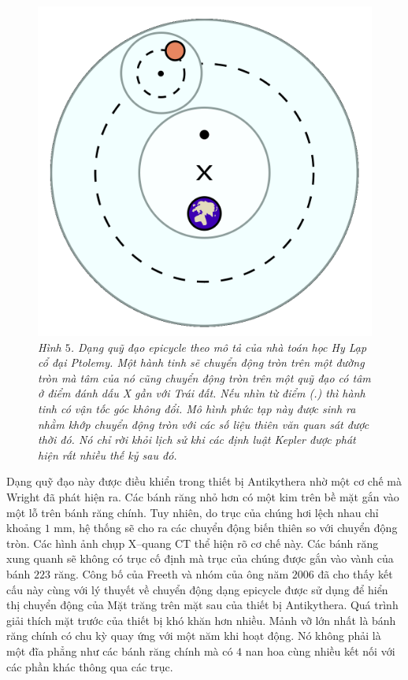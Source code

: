 \begin{multicols}{2}
	\begin{figure}[H]
		\vspace*{-5pt}
		\centering
		\captionsetup{labelformat= empty, justification=centering}
		\includegraphics[width= 0.8\linewidth]{6}
		\caption{\small\textit{\color{lichsutoanhoc}Hình $5$. Dạng quỹ đạo epicycle theo mô tả của nhà toán học Hy Lạp cổ đại Ptolemy. Một hành tinh sẽ chuyển động tròn trên một đường tròn mà tâm của nó cũng chuyển động tròn trên một quỹ đạo có tâm ở điểm đánh dấu X gần với Trái đất. Nếu nhìn từ điểm (.) thì hành tinh có vận tốc góc không đổi. Mô hình phức tạp này được sinh ra nhằm khớp chuyển động tròn với các số liệu thiên văn quan sát được thời đó. Nó chỉ rời khỏi lịch sử khi các định luật Kepler được phát hiện rất nhiều thế kỷ sau đó.}}
		\vspace*{-10pt}
	\end{figure}
	Dạng quỹ đạo này được điều khiển trong thiết bị Antikythera nhờ một cơ chế mà Wright đã phát hiện ra. Các bánh răng nhỏ hơn có một kim trên bề mặt gắn vào một lỗ trên bánh răng chính. Tuy nhiên, do trục của chúng hơi lệch nhau chỉ khoảng $1$ mm, hệ thống sẽ cho ra các chuyển động biến thiên so với chuyển động tròn. Các hình ảnh chụp X--quang CT thể hiện rõ cơ chế này. Các bánh răng xung quanh sẽ không có trục cố định mà trục của chúng được gắn vào vành của bánh $223$ răng. Công bố của Freeth và nhóm của ông năm $2006$ đã cho thấy kết cấu này cùng với lý thuyết về chuyển động dạng epicycle được sử dụng để hiển thị chuyển động của Mặt trăng trên mặt sau của thiết bị Antikythera.
	\vskip 0.1cm
	Quá trình giải thích mặt trước của thiết bị khó khăn hơn nhiều. Mảnh vỡ lớn nhất là bánh răng chính có chu kỳ quay ứng với một năm khi hoạt động. Nó không phải là một đĩa phẳng như các bánh răng chính mà có $4$ nan hoa cùng nhiều kết nối với các phần khác thông qua các trục.

\end{multicols}
